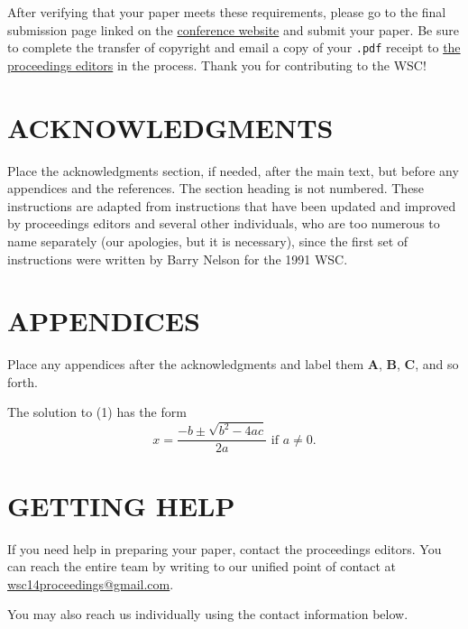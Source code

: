 \documentclass{wscpaperproc}
\theoremstyle{wsc}
\begin{document}
After verifying that your paper meets these requirements, please go to the final submission page linked on the \href{http://www.wintersim.org}{conference website} \cite{WSC} and submit your paper.
Be sure to complete the transfer of copyright and email a copy of your {\tt .pdf} receipt to \href{mailto://wsc14proceedings@gmail.com}{the proceedings editors} in the process.
Thank you for contributing to the WSC!

\section*{ACKNOWLEDGMENTS}
Place the acknowledgments section, if needed, after the main text, but before any appendices and the references. The section heading is not numbered.
These instructions are adapted from instructions that have been updated and improved by proceedings editors and several other individuals, who are too numerous to name separately (our apologies, but it is necessary), since the first set of instructions were written by Barry Nelson for the 1991 WSC.

\appendix

\section{APPENDICES} \label{app:quadratic}
Place any appendices after the acknowledgments and label them
\textbf{A}, \textbf{B}, \textbf{C}, and so forth.

The solution to (1) has the form
\begin{equation} \label{eq: quadratic sol}
x = \frac{-b \pm \sqrt{b^2-4ac}}{2a} \mbox{ if } a \ne 0.
\end{equation}

\section{GETTING HELP}
If you need help in preparing your paper, contact the proceedings editors. You can reach the entire team by writing to our unified point of contact at \href{mailto://wsc14proceedings@gmail.com}{wsc14proceedings@gmail.com}.

You may also reach us individually using the contact information below.

\vspace{6pt}
\end{document}
